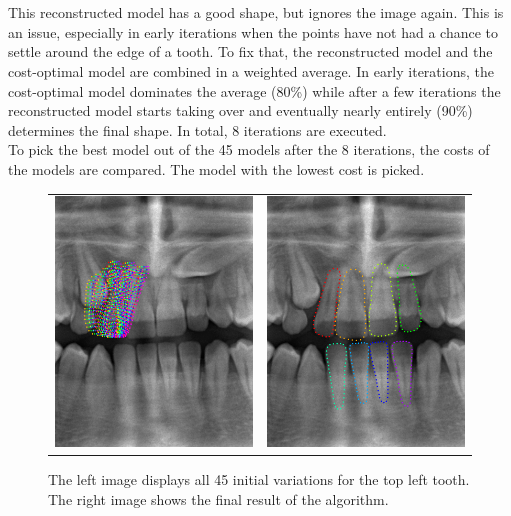 \documentclass[a4paper,10pt]{article}
\begin{document}
\\\\
This reconstructed model has a good shape, but ignores the image again. This is an issue, especially in early iterations when the points have not had a chance to settle around the edge of a tooth. To fix that, the reconstructed model and the cost-optimal model are combined in a weighted average. In early iterations, the cost-optimal model dominates the average (80\%) while after a few iterations the reconstructed model starts taking over and eventually nearly entirely (90\%) determines the final shape. In total, 8 iterations are executed.
\\
To pick the best model out of the 45 models after the 8 iterations, the costs of the models are compared. The model with the lowest cost is picked.
\begin{figure}[!h]
\begin{tabular}{cc}
\includegraphics[width=80mm]{tooth_variations.png} & \includegraphics[width=80mm]{tooth_result_1.png}\\
 
\end{tabular}
 \caption{The left image displays all 45 initial variations for the top left tooth. The right image shows the final result of the algorithm.}
\end{figure}
\end{document}
